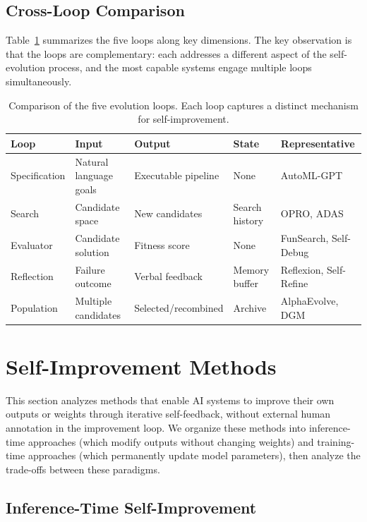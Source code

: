 \documentclass[11pt,a4paper]{article}
\begin{document}
\subsection{Cross-Loop Comparison}

Table~\ref{tab:loop-comparison} summarizes the five loops along key dimensions. The key observation is that the loops are complementary: each addresses a different aspect of the self-evolution process, and the most capable systems engage multiple loops simultaneously.

\begin{table}[t]
\centering
\caption{Comparison of the five evolution loops. Each loop captures a distinct mechanism for self-improvement.}
\label{tab:loop-comparison}
\small
\begin{tabular}{@{}p{2cm}p{2.5cm}p{2.5cm}p{2cm}p{2.5cm}@{}}
\toprule
\textbf{Loop} & \textbf{Input} & \textbf{Output} & \textbf{State} & \textbf{Representative} \\
\midrule
Specification & Natural language goals & Executable pipeline & None & AutoML-GPT \\
Search & Candidate space & New candidates & Search history & OPRO, ADAS \\
Evaluator & Candidate solution & Fitness score & None & FunSearch, Self-Debug \\
Reflection & Failure outcome & Verbal feedback & Memory buffer & Reflexion, Self-Refine \\
Population & Multiple candidates & Selected/recombined & Archive & AlphaEvolve, DGM \\
\bottomrule
\end{tabular}
\end{table}

\section{Self-Improvement Methods}
\label{sec:self-improvement}

This section analyzes methods that enable AI systems to improve their own outputs or weights through iterative self-feedback, without external human annotation in the improvement loop. We organize these methods into inference-time approaches (which modify outputs without changing weights) and training-time approaches (which permanently update model parameters), then analyze the trade-offs between these paradigms.

\subsection{Inference-Time Self-Improvement}
\end{document}
